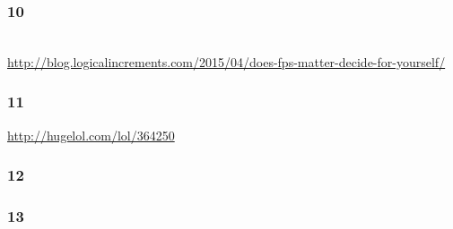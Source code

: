 \documentclass{UDEbeamerEN}
\begin{document}
\begin{frame}
	\frametitle{10}

			\begin{center}
				\\
				{\small\url{http://blog.logicalincrements.com/2015/04/does-fps-matter-decide-for-yourself/}}
			\end{center}
\end{frame}

\begin{frame}
	\frametitle{11}

	\begin{center}
		\vspace{2mm}
		\url{http://hugelol.com/lol/364250}
	\end{center}
\end{frame}

\begin{frame}
	\frametitle{12}


\end{frame}

\begin{frame}
	\frametitle{13}


\end{frame}
\end{document}
